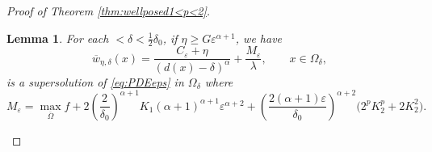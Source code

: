 \documentclass[11pt,reqno]{amsart}
\numberwithin{figure}{section}
\theoremstyle{plain}
\newtheorem{lem}[thm]{Lemma}
\theoremstyle{remark}
\numberwithin{equation}{section}
\begin{document}
\begin{appendices}
\begin{proof} [Proof of Theorem \ref{thm:wellposed1<p<2}]
\begin{lem}\label{lem:subsln} For each $<\delta < \frac{1}{2}\delta_0$, if $\eta\geq G\varepsilon^{\alpha+1}$, we have
\begin{equation*}
    \overline{w}_{\eta,\delta}(x) = \frac{C_\varepsilon+\eta}{(d(x)-\delta)^\alpha} +\frac{M_\varepsilon}{\lambda},\qquad x\in \Omega_\delta, 
\end{equation*}
is a supersolution of \eqref{eq:PDEeps} in $\Omega_\delta$ where
\begin{equation}\label{e:M_eps}
    M_\varepsilon = \max_{\overline{\Omega}} f + 2\left(\frac{2}{\delta_0}\right)^{\alpha+1}K_1(\alpha+1)^{\alpha+1}\varepsilon^{\alpha+2} + \left(\frac{2(\alpha+1)\varepsilon}{\delta_0}\right)^{\alpha+2}\big(2^pK_2^p+2K_2^2\big).
\end{equation}
\end{lem}


\end{proof}
\end{appendices}
\end{document}
